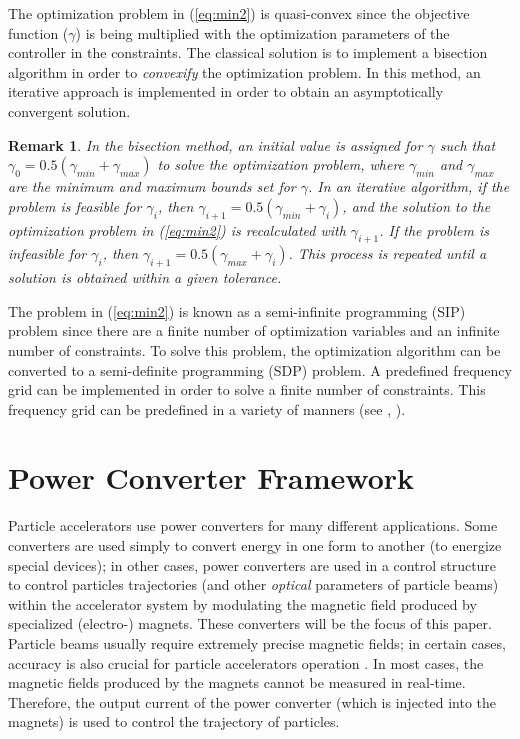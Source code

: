 \documentclass[journal]{IEEEtran}
\newtheorem*{remark}{Remark}
\begin{document}
The optimization problem in (\ref{eq:min2}) is quasi-convex since the objective function ($\gamma$) is being multiplied with the optimization parameters of the controller in the constraints. The classical solution is to implement a bisection algorithm in order to \emph{convexify} the optimization problem. In this method, an iterative approach is implemented in order to obtain an asymptotically convergent solution. 
\begin{remark}
In the bisection method, an initial value is assigned for $\gamma$ such that $\gamma_0 = 0.5(\gamma_{min} + \gamma_{max})$ to solve the optimization problem, where $\gamma_{min}$ and $\gamma_{max}$ are the minimum and maximum bounds set for $\gamma$. In an iterative algorithm, if the problem is feasible for $\gamma_i$, then $\gamma_{i+1} = 0.5(\gamma_{min} + \gamma_i)$, and the solution to the optimization problem in (\ref{eq:min2}) is recalculated with $\gamma_{i+1}$. If the problem is infeasible for $\gamma_i$, then $\gamma_{i+1} = 0.5(\gamma_{max} + \gamma_i)$. This process is repeated until a solution is obtained within a given tolerance. 
\end{remark}

The problem in (\ref{eq:min2}) is known as a semi-infinite programming (SIP) problem since there are a finite number of optimization variables and an infinite number of constraints. To solve this problem, the optimization algorithm can be converted to a semi-definite programming (SDP) problem. A predefined frequency grid can be implemented in order to solve a finite number of constraints. This frequency grid can be predefined in a variety of manners (see \cite{SVBB11}, \cite{GKL10b}). 

\section{Power Converter Framework}
\label{sec:4}
Particle accelerators use power converters for many different applications. Some converters are used simply to convert energy in one form to another (to energize special devices); in other cases, power converters are used in a control structure to control particles trajectories (and other \emph{optical} parameters of particle beams) within the accelerator system by modulating the magnetic field produced by specialized (electro-) magnets. These converters will be the focus of this paper. Particle beams usually require extremely precise magnetic fields; in certain cases, accuracy is also crucial for particle accelerators operation \cite{TPMK10}. In most cases, the magnetic fields produced by the magnets cannot be measured in real-time. Therefore, the output current of the power converter (which is injected into the magnets) is used to control the trajectory of particles. 
\end{document}
